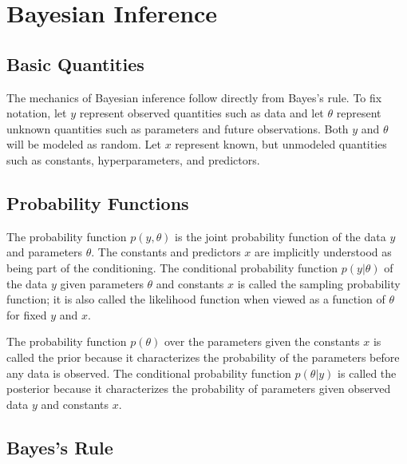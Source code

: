 \section{Bayesian Inference}

\subsection{Basic Quantities}

The mechanics of Bayesian inference follow directly from Bayes's rule.
To fix notation, let $y$ represent observed quantities such as data
and let $\theta$ represent unknown quantities such as parameters and
future observations.  Both $y$ and $\theta$ will be modeled as random.
Let $x$ represent known, but unmodeled quantities such as constants,
hyperparameters, and predictors.

\subsection{Probability Functions}

The probability function $p(y,\theta)$ is the joint probability
function of the data $y$ and parameters $\theta$.  The constants and
predictors $x$ are implicitly understood as being part of the
conditioning.  The conditional probability function $p(y|\theta)$ of
the data $y$ given parameters $\theta$ and constants $x$ is called the
sampling probability function; it is also called the likelihood
function when viewed as a function of $\theta$ for fixed $y$ and $x$.

The probability function $p(\theta)$ over the parameters given the
constants $x$ is called the prior because it characterizes the probability
of the parameters before any data is observed.  The conditional
probability function $p(\theta|y)$ is called the posterior because
it characterizes the probability of parameters given observed data $y$
and constants $x$.  

\subsection{Bayes's Rule}

